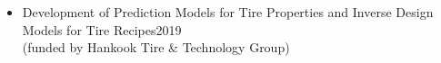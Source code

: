 \begin{itemize}[nosep, wide=0pt]
    \item \small Development of Prediction Models for Tire Properties and Inverse Design Models for Tire Recipes\hfill 2019\\ \hspace{5mm}(funded by Hankook Tire \& Technology Group)
\end{itemize}



